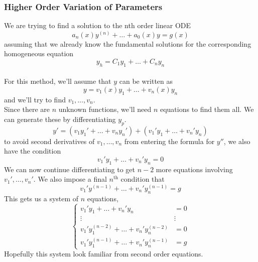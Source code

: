 \subsubsection{Higher Order Variation of Parameters}
\noindent
We are trying to find a solution to the nth order linear ODE
\begin{equation*}
	a_n(x)y^{(n)} + \ldots + a_0(x)y = g(x)
\end{equation*}
assuming that we already know the fundamental solutions for the corresponding homogeneous equation
\begin{equation*}
	y_h = C_1y_1 + \ldots + C_ny_n
\end{equation*}\\

\noindent
For this method, we'll assume that $y$ can be written as
\begin{equation*}
	y = v_1(x)y_1 + \ldots + v_n(x)y_n
\end{equation*}
and we'll try to find $v_1, \ldots, v_n$.\\

\noindent
Since there are $n$ unknown functions, we'll need $n$ equations to find them all. We can generate these by differentiating $y_p$.
\begin{equation*}
	y' = \left(v_1y_1' + \ldots + v_ny_n'\right) + \left(v_1'y_1 + \ldots + v_n'y_n\right)
\end{equation*}
to avoid second derivatives of $v_1, \ldots, v_n$ from entering the formula for $y''$, we also have the condition
\begin{equation*}
	v_1'y_1 + \ldots +v_n'y_n = 0
\end{equation*}
We can now continue differentiating to get $n-2$ more equations involving $v_1', \ldots, v_n'$. We also impose a final $n^{\text{th}}$ condition that
\begin{equation*}
	v_1'y^{(n-1)} + \ldots + v_n'y_n^{(n-1)} = g
\end{equation*}
This gets us a system of $n$ equations,
\begin{equation*}
	\begin{cases}
		v_1'y_1 + \ldots + v_n' y_n & = 0 \\
		\vdots & \vdots \\
		v_1'y_1^{(n-2)} + \ldots + v_n'y_n^{(n-2)} & = 0 \\
		v_1'y_1^{(n-1)} + \ldots + v_n'y_n^{(n-1)} & = g
	\end{cases} 
\end{equation*}
Hopefully this system look familiar from second order equations.\\

